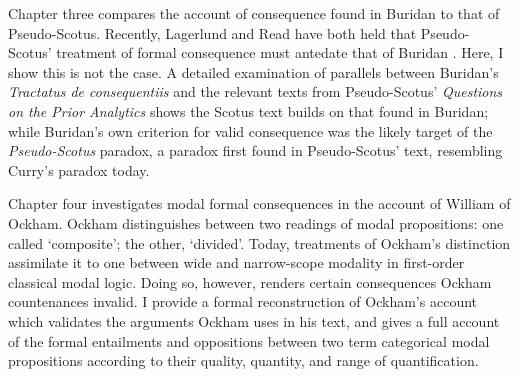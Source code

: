 			Chapter three compares the account of consequence found in Buridan to that of Pseudo-Scotus. Recently, Lagerlund and Read have both held that Pseudo-Scotus' treatment of formal consequence must antedate that of Buridan \cite{Lagerlund2000} \cite{Read2015}. Here, I show this is not the case. A detailed examination of parallels between Buridan's \textit{Tractatus de consequentiis} and the relevant texts from Pseudo-Scotus' \textit{Questions on the Prior Analytics} shows the Scotus text builds on that found in Buridan; while Buridan's own criterion for valid consequence was the likely target of the \textit{Pseudo-Scotus} paradox, a paradox first found in Pseudo-Scotus' text, resembling Curry's paradox today.
			
			Chapter four investigates modal formal consequences in the account of William of Ockham. Ockham distinguishes between two readings of modal propositions: one called `composite'; the other, `divided'. Today, treatments of Ockham's distinction assimilate it to one between wide and narrow-scope modality in first-order classical modal logic. Doing so, however, renders certain consequences Ockham countenances invalid. I provide a formal reconstruction of Ockham's account which validates the arguments Ockham uses in his text, and gives a full account of the formal entailments and oppositions between two term categorical modal propositions according to their quality, quantity, and range of quantification.
			
